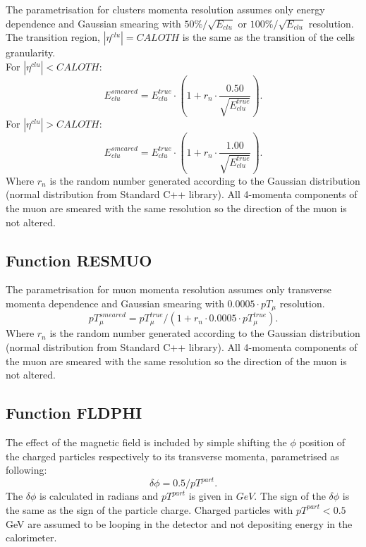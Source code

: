 The parametrisation for clusters momenta resolution assumes only 
energy dependence and Gaussian
smearing with $50\%/\sqrt{E_{clu}}$ or $100\%/\sqrt{E_{clu}}$
resolution.
The transition region, $|\eta^{clu}| = CALOTH$  is the same as the 
transition of the cells granularity. \\
For  $|\eta^{clu}| < CALOTH$:
\begin{equation}
 E_{clu}^{smeared}  = 
E_{clu}^{true} \cdot (1+ r_n \cdot \frac{0.50}{\sqrt{E_{clu}^{true}}}). 
\end{equation}
For  $|\eta^{clu}| > CALOTH$:
\begin{equation}
 E_{clu}^{smeared}  = 
E_{clu}^{true} \cdot (1+ r_n \cdot \frac{1.00}{\sqrt{E_{clu}^{true}}}). 
\end{equation}
Where $r_n$ is the random number generated according to the Gaussian
distribution (normal distribution from Standard C++ library).
All 4-momenta components of the muon are smeared with the same
resolution so the direction of the muon is not altered. 

\subsection{Function RESMUO}

The parametrisation for muon momenta resolution assumes only 
transverse momenta dependence and Gaussian
smearing with $0.0005 \cdot pT_{\mu}$ resolution.
\begin{equation}
 pT_{\mu}^{smeared}  = 
pT_{\mu}^{true}/(1+ r_n \cdot 0.0005 \cdot pT_{\mu}^{true}). 
\end{equation}
Where $r_n$ is the random number generated according to the Gaussian
distribution (normal distribution from Standard C++ library).
All 4-momenta components of the muon are smeared with the same
resolution so the direction of the muon is not altered. 

\subsection{Function FLDPHI}

The effect of the magnetic field is included by simple shifting the
$\phi$ position of the charged particles respectively to its
transverse momenta, parametrised as following:
\begin{equation}
 \delta \phi   =  0.5 / pT^{part}. 
\end{equation}
The $ \delta \phi$ is calculated in radians and $pT^{part}$ is
given in $GeV$.
The sign of the  $ \delta \phi$ is the same as the sign of the
particle charge.
Charged particles with  $pT^{part} < 0.5$ GeV are assumed to be
looping in the detector and not depositing energy in the calorimeter.


